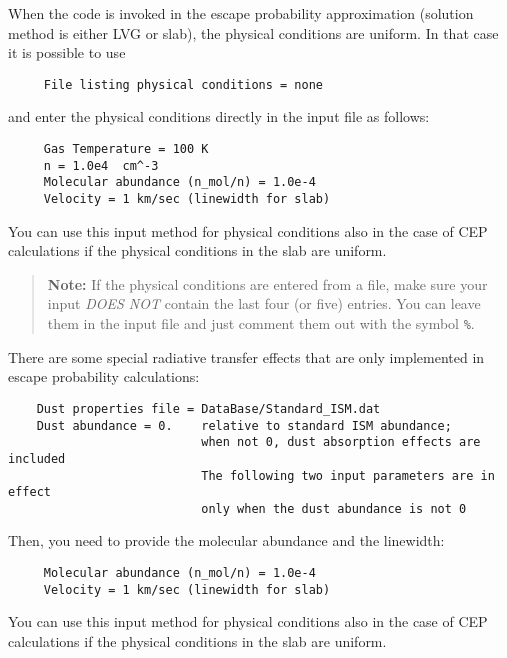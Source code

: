 \documentclass[12pt]{article}
\def\separation {0.5cm}
\begin{document}
When the code is invoked in the escape probability approximation (solution
method is either LVG or slab), the physical conditions are uniform. In that
case it is possible to use
%
\smallskip
\begin{verbatim}
     File listing physical conditions = none
\end{verbatim}
and enter the physical conditions directly in the input file as follows:
\vspace{\separation}
\begin{verbatim}
     Gas Temperature = 100 K
     n = 1.0e4  cm^-3
     Molecular abundance (n_mol/n) = 1.0e-4
     Velocity = 1 km/sec (linewidth for slab)
\end{verbatim}
You can use this input method for physical conditions also in the case of CEP
calculations if the physical conditions in the slab are uniform.

\begin{quote}
{\bf Note:} If the physical conditions are entered from a file, make sure your
input {\em DOES NOT} contain the last four (or five) entries. You can leave
them in the input file and just comment them out with the symbol {\tt \%}.
\end{quote}

There are some special radiative transfer effects that are only implemented
in escape probability calculations:
\begin{verbatim}
    Dust properties file = DataBase/Standard_ISM.dat
    Dust abundance = 0.    relative to standard ISM abundance; 
                           when not 0, dust absorption effects are included 
                           The following two input parameters are in effect 
                           only when the dust abundance is not 0
\end{verbatim}

Then, you need to provide the molecular abundance and the linewidth:
\begin{verbatim}
     Molecular abundance (n_mol/n) = 1.0e-4
     Velocity = 1 km/sec (linewidth for slab)
\end{verbatim}
You can use this input method for physical conditions also in the case of CEP
calculations if the physical conditions in the slab are uniform.
\end{document}
